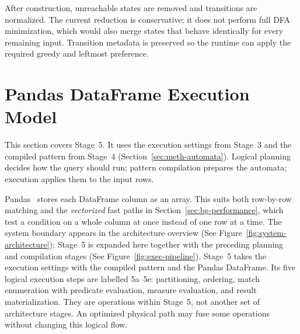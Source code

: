 After construction, unreachable states are removed and transitions
are normalized.  The current reduction is conservative; it does not
perform full DFA minimization, which would also merge states that
behave identically for every remaining input.  Transition metadata is preserved so
the runtime can apply the required greedy and leftmost preference.

\section{Pandas DataFrame Execution Model}
\label{sec:meth-pandas}

This section covers Stage~5.  It uses the execution settings from
Stage~3 and the compiled pattern from Stage~4
(Section~\ref{sec:meth-automata}).  Logical planning decides how the
query should run; pattern compilation prepares the automata; execution
applies them to the input rows.

Pandas~\cite{McKinney2010} stores each DataFrame column as an
array.  This suits both row-by-row matching and the \emph{vectorized}
fast paths in Section~\ref{sec:bg-performance}, which test a condition
on a whole column at once instead of one row at a time.  The system
boundary appears in the architecture overview (See
Figure~\ref{fig:system-architecture}); Stage~5 is expanded here together
with the preceding planning and compilation stages (See
Figure~\ref{fig:exec-pipeline}).
Stage~5 takes the execution settings with the compiled pattern and the
Pandas DataFrame.  Its five logical execution steps are labelled
5a--5e: partitioning, ordering, match
enumeration with predicate evaluation, measure evaluation, and result
materialization.  They are operations within Stage~5, not another set
of architecture stages.  An optimized physical path may fuse some
operations without changing this logical flow.

